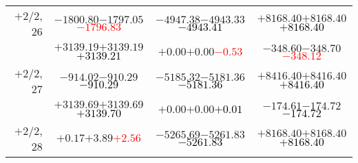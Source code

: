\documentclass[compress]{beamer}
\begin{document}
\begin{frame}
{\begin{tabular}{r | c | c | c}
$+$2/2, 26 & $-1800.80$\hspace{0.1 cm}$-1797.05$\hspace{0.1 cm}\textcolor{red}{$-1796.83$} & $-4947.38$\hspace{0.1 cm}$-4943.33$\hspace{0.1 cm}\textcolor{black}{$-4943.41$} & $+8168.40$\hspace{0.1 cm}$+8168.40$\hspace{0.1 cm}\textcolor{black}{$+8168.40$} \\
           & $+3139.19$\hspace{0.1 cm}$+3139.19$\hspace{0.1 cm}\textcolor{black}{$+3139.21$} & $+0.00$\hspace{0.1 cm}$+0.00$\hspace{0.1 cm}\textcolor{red}{$-0.53$} & $-348.60$\hspace{0.1 cm}$-348.70$\hspace{0.1 cm}\textcolor{red}{$-348.12$} \\
$+$2/2, 27 & $-914.02$\hspace{0.1 cm}$-910.29$\hspace{0.1 cm}\textcolor{black}{$-910.29$} & $-5185.32$\hspace{0.1 cm}$-5181.36$\hspace{0.1 cm}\textcolor{black}{$-5181.36$} & $+8416.40$\hspace{0.1 cm}$+8416.40$\hspace{0.1 cm}\textcolor{black}{$+8416.40$} \\
           & $+3139.69$\hspace{0.1 cm}$+3139.69$\hspace{0.1 cm}\textcolor{black}{$+3139.70$} & $+0.00$\hspace{0.1 cm}$+0.00$\hspace{0.1 cm}\textcolor{black}{$+0.01$} & $-174.61$\hspace{0.1 cm}$-174.72$\hspace{0.1 cm}\textcolor{black}{$-174.72$} \\
$+$2/2, 28 & $+0.17$\hspace{0.1 cm}$+3.89$\hspace{0.1 cm}\textcolor{red}{$+2.56$} & $-5265.69$\hspace{0.1 cm}$-5261.83$\hspace{0.1 cm}\textcolor{black}{$-5261.83$} & $+8168.40$\hspace{0.1 cm}$+8168.40$\hspace{0.1 cm}\textcolor{black}{$+8168.40$} \\

\end{tabular}}
\end{frame}
\end{document}
